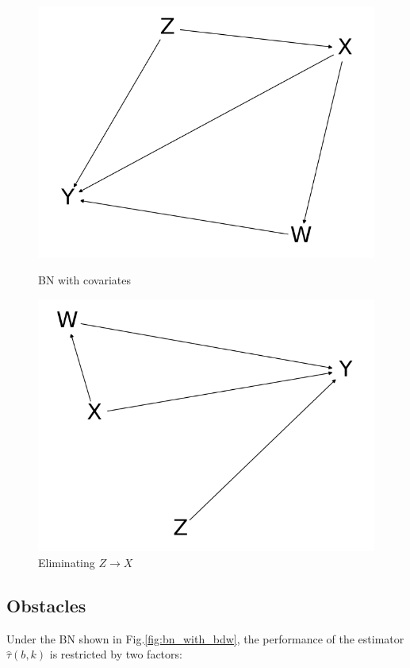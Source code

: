 \documentclass[a4 paper,12pt]{article}
\begin{document}
\begin{figure}[h]
	\centering
	\includegraphics[scale=0.3]{Figure_3.png}
   \caption{BN with covariates}
   \label{bn_with_covar}
	\includegraphics[scale=0.3]{Figure_4.png}
	\caption{Eliminating $Z\rightarrow X$}
\end{figure}

\subsection{Obstacles}
\label{sec:obstacles}

Under the BN shown in Fig.\ref{fig:bn_with_bdw}, the performance of the estimator $\hat \tau(b,k)$ is restricted by two factors:
\end{document}
